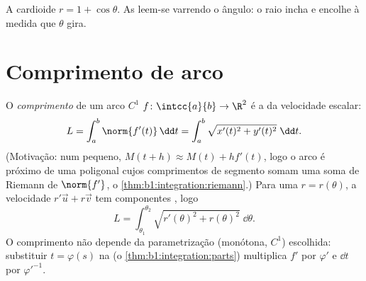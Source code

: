 \begin{omfigure}

{\small A cardioide $r = 1 + \cos\theta$. As  leem-se varrendo o
ângulo: o raio incha e encolhe à medida que $\theta$ gira.}
\end{omfigure}

\section{Comprimento de arco}

\begin{definition}\label{def:b1:curves:arclength}
O \emph{comprimento} de um arco $C^1$
$f \colon
\intcc{a}{b} \to \R^2$ é a  da velocidade escalar:
\[
L = \int_a^b \norm{f'(t)}\,\dd t
= \int_a^b \sqrt{x'(t)^2 + y'(t)^2}\;\dd t .
\]
(Motivação: num  pequeno, $M(t + h) \approx M(t) + h
f'(t)$, logo o arco é próximo de
uma poligonal cujos comprimentos de segmento somam uma soma de
Riemann de $\norm{f'}$, o \cref{thm:b1:integration:riemann}.) Para uma  $r =
r(\theta)$, a velocidade
$r'\vec u + r\vec v$ tem componentes , logo
\[
L = \int_{\theta_1}^{\theta_2}
\sqrt{r'(\theta)^2 + r(\theta)^2}\;\dd\theta .
\]
O comprimento não depende da parametrização (monótona, $C^1$)
escolhida: substituir $t = \varphi(s)$ na  (o \cref{thm:b1:integration:parts}) multiplica $f'$ por
$\varphi'$ e $\dd t$ por $\varphi'^{-1}$.
\end{definition}

